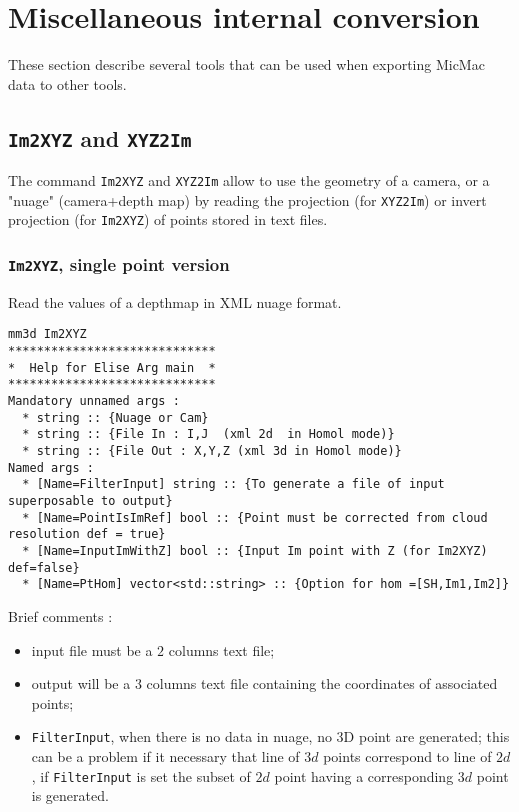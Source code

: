 
\section{Miscellaneous internal conversion}

These section describe several tools that can be used when exporting MicMac data to
other tools.

\subsection{{\tt Im2XYZ} and {\tt XYZ2Im}}

The command {\tt Im2XYZ} and {\tt XYZ2Im}  allow to use the geometry of a camera, or a
"nuage" (camera+depth map) by reading the projection (for {\tt XYZ2Im}) or invert projection (for  {\tt Im2XYZ})
of points stored in text files.

\subsubsection{{\tt Im2XYZ}, single point version}

Read the values of a depthmap in XML nuage format.

\begin{verbatim}
mm3d Im2XYZ
*****************************
*  Help for Elise Arg main  *
*****************************
Mandatory unnamed args : 
  * string :: {Nuage or Cam}
  * string :: {File In : I,J  (xml 2d  in Homol mode)}
  * string :: {File Out : X,Y,Z (xml 3d in Homol mode)}
Named args : 
  * [Name=FilterInput] string :: {To generate a file of input superposable to output}
  * [Name=PointIsImRef] bool :: {Point must be corrected from cloud resolution def = true}
  * [Name=InputImWithZ] bool :: {Input Im point with Z (for Im2XYZ) def=false}
  * [Name=PtHom] vector<std::string> :: {Option for hom =[SH,Im1,Im2]}
\end{verbatim}

Brief comments :

\begin{itemize}
    \item input file must be a $2$ columns text file;

    \item output will be a $3$ columns text file containing the coordinates of associated points;

    \item {\tt FilterInput}, when there is no data in nuage, no 3D point  are generated; this can be a problem 
          if it necessary that line of $3d$ points correspond to line of $2d$, if {\tt FilterInput}
          is set the subset of $2d$ point having a corresponding $3d$ point is generated.
\end{itemize}


